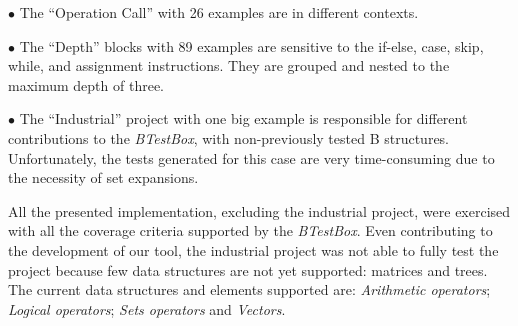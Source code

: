 \documentclass[runningheads]{llncs}
\begin{document}
    $\bullet$ The ``Operation Call'' with 26 examples are in different contexts.
    
    $\bullet$ The ``Depth'' blocks with 89 examples are sensitive to the if-else, case, skip, while, and assignment instructions. They are grouped and nested to the maximum depth of three.
    
    $\bullet$ The ``Industrial'' project with one big example is responsible for different contributions to the \textit{BTestBox}, with non-previously tested B structures. Unfortunately, the tests generated for this case are very time-consuming due to the necessity of set expansions.
    


All the presented implementation, excluding the industrial project, were exercised with all the coverage criteria supported by the \textit{BTestBox}. Even contributing to the development of our tool, the industrial project was not able to fully test the project because few data structures are not yet supported: matrices and trees. 
The current data structures and elements supported are: \textit{Arithmetic operators}; \textit{Logical operators};  \textit{Sets operators} and \textit{Vectors}.

\end{document}
